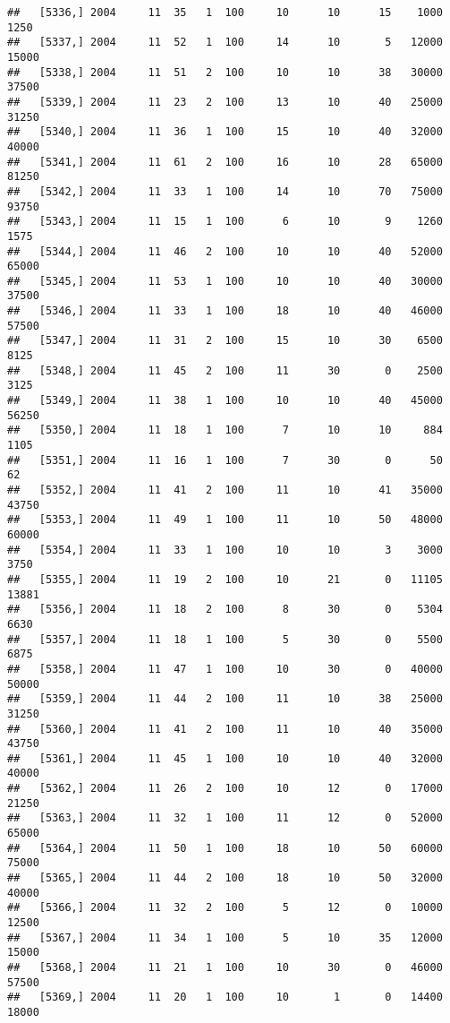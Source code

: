 \documentclass{article}\usepackage[]{graphicx}\usepackage[]{color}
\makeatletter
\newenvironment{kframe}{%
 \def\at@end@of@kframe{}%
 \ifinner\ifhmode%
  \def\at@end@of@kframe{\end{minipage}}%
  \begin{minipage}{\columnwidth}%
 \fi\fi%
 \def\FrameCommand##1{\hskip\@totalleftmargin \hskip-\fboxsep
 \colorbox{shadecolor}{##1}\hskip-\fboxsep
     \hskip-\linewidth \hskip-\@totalleftmargin \hskip\columnwidth}%
 \MakeFramed {\advance\hsize-\width
   \@totalleftmargin\z@ \linewidth\hsize
   \@setminipage}}%
 {\par\unskip\endMakeFramed%
 \at@end@of@kframe}
\newenvironment{knitrout}{}{} %
\makeatother
\begin{document}
\begin{knitrout}
\begin{kframe}
\begin{verbatim}
##   [5336,] 2004     11  35   1  100     10      10      15    1000    1250
##   [5337,] 2004     11  52   1  100     14      10       5   12000   15000
##   [5338,] 2004     11  51   2  100     10      10      38   30000   37500
##   [5339,] 2004     11  23   2  100     13      10      40   25000   31250
##   [5340,] 2004     11  36   1  100     15      10      40   32000   40000
##   [5341,] 2004     11  61   2  100     16      10      28   65000   81250
##   [5342,] 2004     11  33   1  100     14      10      70   75000   93750
##   [5343,] 2004     11  15   1  100      6      10       9    1260    1575
##   [5344,] 2004     11  46   2  100     10      10      40   52000   65000
##   [5345,] 2004     11  53   1  100     10      10      40   30000   37500
##   [5346,] 2004     11  33   1  100     18      10      40   46000   57500
##   [5347,] 2004     11  31   2  100     15      10      30    6500    8125
##   [5348,] 2004     11  45   2  100     11      30       0    2500    3125
##   [5349,] 2004     11  38   1  100     10      10      40   45000   56250
##   [5350,] 2004     11  18   1  100      7      10      10     884    1105
##   [5351,] 2004     11  16   1  100      7      30       0      50      62
##   [5352,] 2004     11  41   2  100     11      10      41   35000   43750
##   [5353,] 2004     11  49   1  100     11      10      50   48000   60000
##   [5354,] 2004     11  33   1  100     10      10       3    3000    3750
##   [5355,] 2004     11  19   2  100     10      21       0   11105   13881
##   [5356,] 2004     11  18   2  100      8      30       0    5304    6630
##   [5357,] 2004     11  18   1  100      5      30       0    5500    6875
##   [5358,] 2004     11  47   1  100     10      30       0   40000   50000
##   [5359,] 2004     11  44   2  100     11      10      38   25000   31250
##   [5360,] 2004     11  41   2  100     11      10      40   35000   43750
##   [5361,] 2004     11  45   1  100     10      10      40   32000   40000
##   [5362,] 2004     11  26   2  100     10      12       0   17000   21250
##   [5363,] 2004     11  32   1  100     11      12       0   52000   65000
##   [5364,] 2004     11  50   1  100     18      10      50   60000   75000
##   [5365,] 2004     11  44   2  100     18      10      50   32000   40000
##   [5366,] 2004     11  32   2  100      5      12       0   10000   12500
##   [5367,] 2004     11  34   1  100      5      10      35   12000   15000
##   [5368,] 2004     11  21   1  100     10      30       0   46000   57500
##   [5369,] 2004     11  20   1  100     10       1       0   14400   18000

\end{verbatim}
\end{kframe}
\end{knitrout}
\end{document}
